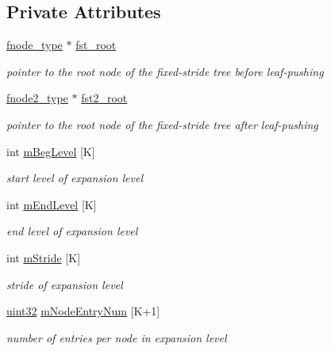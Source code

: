 \subsection*{Private Attributes}
\begin{DoxyCompactItemize}
\item 
\hyperlink{classFSTree_a67d384ab5a196299d83dde842299fe7f}{fnode\-\_\-type} $\ast$ \hyperlink{classFSTree_ae2f006ad7037ccce518c2e21cebde7f1}{fst\-\_\-root}
\begin{DoxyCompactList}\small\item\em pointer to the root node of the fixed-\/stride tree before leaf-\/pushing \end{DoxyCompactList}\item 
\hyperlink{classFSTree_ae109ec54da0c7eb682ab08c8f8bc615c}{fnode2\-\_\-type} $\ast$ \hyperlink{classFSTree_a39e875f7b80caa1e8d79dc893f06cf97}{fst2\-\_\-root}
\begin{DoxyCompactList}\small\item\em pointer to the root node of the fixed-\/stride tree after leaf-\/pushing \end{DoxyCompactList}\item 
int \hyperlink{classFSTree_afe2edb406c6e4b670a59e7c3d1edaa70}{m\-Beg\-Level} \mbox{[}K\mbox{]}
\begin{DoxyCompactList}\small\item\em start level of expansion level \end{DoxyCompactList}\item 
int \hyperlink{classFSTree_a6e0ee4d265489224ed08378a5f2e3b1f}{m\-End\-Level} \mbox{[}K\mbox{]}
\begin{DoxyCompactList}\small\item\em end level of expansion level \end{DoxyCompactList}\item 
int \hyperlink{classFSTree_a463862d4c2ae3ec8a1bab6c66c3ed395}{m\-Stride} \mbox{[}K\mbox{]}
\begin{DoxyCompactList}\small\item\em stride of expansion level \end{DoxyCompactList}\item 
\hyperlink{types_8h_abd01e8e67e3d94cab04ecaaf4f85ac1b}{uint32} \hyperlink{classFSTree_a8130db6daaa9b99921230e9349a66888}{m\-Node\-Entry\-Num} \mbox{[}K+1\mbox{]}
\begin{DoxyCompactList}\small\item\em number of entries per node in expansion level \end{DoxyCompactList}\item 

\end{DoxyCompactItemize}
